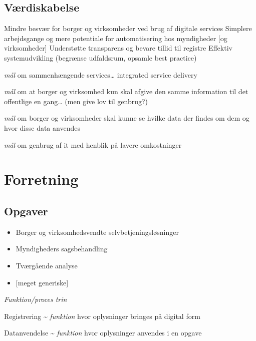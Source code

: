 \subsection{Værdiskabelse}\label{vuxe6rdiskabelse}

Mindre besvær for borger og virksomheder ved brug af digitale services
Simplere arbejdsgange og mere potentiale for automatisering hos
myndigheder {[}og virksomheder{]} Understøtte transparens og bevare
tillid til registre Effektiv systemudvikling (begrænse udfaldsrum,
opsamle best practice)

\begin{description}
\tightlist
\item[Interoperability]
\emph{mål} om sammenhængende services\ldots{} integrated service
delivery
\item[Once-only]
\emph{mål} om at borger og virksomhed kun skal afgive den samme
information til det offentlige en gang\ldots{} (men give lov til
genbrug?)
\item[Transperancy]
\emph{mål} om borger og virksomheder skal kunne se hvilke data der
findes om dem og hvor disse data anvendes
\item[Re-use]
\emph{mål} om genbrug af it med henblik på lavere omkostninger
\end{description}

\section{Forretning}\label{forretning}

\subsection{Opgaver}\label{opgaver}

\begin{itemize}
\tightlist
\item
  Borger og virksomhedsvendte selvbetjeningsløsninger
\item
  Myndigheders sagsbehandling
\item
  Tværgående analyse
\item
  {[}meget generiske{]}
\end{itemize}

\emph{Funktion/proces trin}

Registrering \textasciitilde{} \emph{funktion} hvor oplysninger bringes
på digital form

Datanvendelse \textasciitilde{} \emph{funktion} hvor oplysninger
anvendes i en opgave

